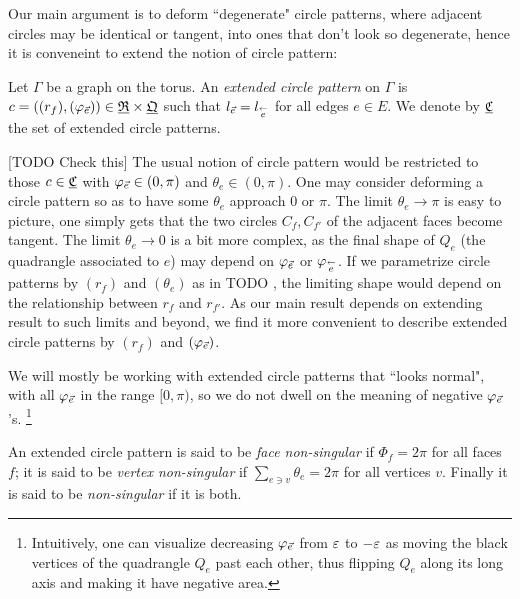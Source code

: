 Our main argument is to deform ``degenerate" circle patterns,
where adjacent circles may
be identical or tangent, into ones that don't look so degenerate,
hence it is conveneint to extend the notion of circle pattern:

\begin{definition}
Let $\Gamma$ be a graph on the torus.
An \emph{extended circle pattern} on $\Gamma$ is
$c = ((r_f), (\varphi_{\vec{e}})) \in {\underline{\mathfrak{R}}} \times {\underline{\mathfrak{Q}}}$
such that $l_{\vec{e}} = l_{\overset{\leftarrow}{e}}$ for all edges $e\in E$. We denote by
${\underline{\mathfrak{C}}}$ the set of extended circle patterns.
\end{definition}




[TODO Check this] The usual notion of circle pattern would be restricted to those $c\in {\underline{\mathfrak{C}}}$
with $\varphi_{\vec{e}} \in (0,\pi)$ and $\theta_e \in (0,\pi)$.
One may consider deforming a circle pattern so as to have some $\theta_e$ approach 0 or $\pi$.
The limit $\theta_e \to \pi$ is easy to picture, one simply gets that the two circles
$C_f, C_{f'}$ of the adjacent faces become tangent. The limit $\theta_e \to 0$
is a bit more complex, as the final shape of $Q_e$ (the quadrangle associated to $e$)
may depend on $\varphi_{\vec{e}}$ or $\varphi_{\overset{\leftarrow}{e}}$.
If we parametrize circle patterns by $(r_f)$ and $(\theta_e)$ as in TODO ,
the limiting shape would depend on the relationship between 
$r_f$ and $r_{f'}$.
As our main result depends on extending  result
to such limits and beyond,
we find it more convenient to describe extended circle patterns by
$(r_f)$ and $(\varphi_{\vec{e}})$.


We will mostly be working with extended circle patterns that ``looks normal",
with all $\varphi_{\vec{e}}$ in the range $[0,\pi)$,
so we do not dwell on the meaning of negative $\varphi_{\vec{e}}$'s.
\footnote{
Intuitively, one can visualize decreasing $\varphi_{\vec{e}}$
from $\varepsilon$ to $-\varepsilon$
as moving the black vertices of the quadrangle $Q_e$ past each other,
thus flipping $Q_e$ along its long axis
and making it have negative area.
}

\begin{definition}
An extended circle pattern is said to be \emph{face non-singular}
if $\Phi_f = 2\pi$ for all faces $f$; it is said to be \emph{vertex non-singular}
if $\sum_{e \ni v} \theta_e = 2\pi$ for all vertices $v$.
Finally it is said to be \emph{non-singular} if it is both.
\end{definition}

